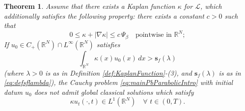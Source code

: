 \documentclass[11pt,a4paper,reqno]{amsart}
\def \LL {\mathcal{L}}
\theoremstyle{definition}
\theoremstyle{plain}
\newtheorem{theorem}[definition]{Theorem}
\numberwithin{equation}{section}
\begin{document}
\begin{theorem} \label{thm:MainNonExistenceKaplan}
Assume that there exists a Kaplan function $\kappa$ for $\LL$, which additionally sati\-sfies the following property: there exists a constant $c > 0$ such that
\begin{equation} \label{eq:ExtraKaplanIntbyParts}
	0\leq \kappa+|\nabla \kappa|\leq c\,\Psi_\beta \quad \text{pointwise in }\mathbb{R}^N;
\end{equation}
If $u_0\in C_+(\mathbb{R}^N)\cap L^\infty(\mathbb{R}^N)$ satisfies
\begin{equation} \label{eq:KaplanConditionuzero}
	\int_{\mathbb{R}^N}\kappa(x)u_0(x)\,dx > \mathbf{s}_f(\lambda)
\end{equation}
\emph{(}where $\lambda > 0$ is as in Definition \ref{def:KaplanFunction}-(3), and $\mathbf{s}_f(\lambda)$ is as in \eqref{eq:defsflambda}\emph{)},  the Cauchy problem \eqref{eq:mainPbParabolicIntro} with initial datum $u_0$ does \emph{not} admit global classical solutions which satisfy
   \begin{equation}\label{e2}
   \kappa u_t(\cdot,t) \in L^{1}(\mathbb{R}^N)\quad\forall\,\,t\in (0,T).
   \end{equation}
   

\end{theorem}
\end{document}
